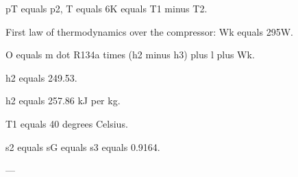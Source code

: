 pT equals p2, T equals 6K equals T1 minus T2.  

First law of thermodynamics over the compressor: Wk equals 295W.  

O equals m dot R134a times (h2 minus h3) plus l plus Wk.  

h2 equals 249.53.  

h2 equals 257.86 kJ per kg.  

T1 equals 40 degrees Celsius.  

s2 equals sG equals s3 equals 0.9164.  

---